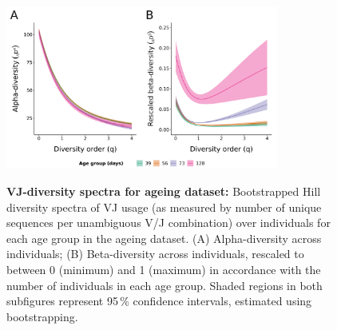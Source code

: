 \begin{figure}
\centering
\includegraphics[width = 0.8\textwidth]{_Figures/png/ageing-VJ-diversity-alpha-beta}
\begin{subfigure}{0em}
\label{fig:igseq-ageing-VJ-diversity-alpha}
\end{subfigure}
\begin{subfigure}{0em}
\label{fig:igseq-ageing-VJ-diversity-beta}
\end{subfigure}
\caption[VJ-diversity spectra for \igseq ageing dataset]{\textbf{VJ-diversity spectra for \igseq ageing dataset:} Bootstrapped Hill diversity spectra of VJ usage (as measured by number of unique sequences per unambiguous V/J combination) over individuals for each age group in the \igseq ageing dataset. (A) Alpha-diversity across individuals; (B) Beta-diversity across individuals, rescaled to between 0 (minimum) and 1 (maximum) in accordance with the number of individuals in each age group. Shaded regions in both subfigures represent 95\,\% confidence intervals, estimated using bootstrapping.}
\label{fig:igseq-ageing-VJ-diversity-spectra}
\end{figure}

